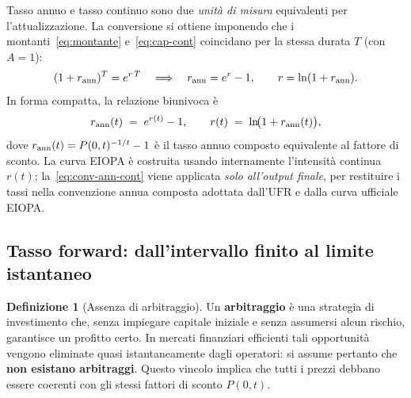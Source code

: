 \documentclass[11pt,a4paper]{article}
\theoremstyle{plain}
\theoremstyle{definition}
\newtheorem{definizione}[teorema]{Definizione}
\theoremstyle{remark}
\newcommand{\UFR}{\ensuremath{\mathrm{UFR}}}
\begin{document}

Tasso annuo e tasso continuo sono due \emph{unit\`a di misura} equivalenti per
l'attualizzazione. La conversione si ottiene imponendo che i montanti~\eqref{eq:montante}
e~\eqref{eq:cap-cont} coincidano per la stessa durata $T$ (con $A=1$):
\[
  (1+r_{\rm ann})^T = e^{r\,T}
  \quad\Longrightarrow\quad
  r_{\rm ann} = e^{r} - 1,\qquad r = \ln(1+r_{\rm ann}).
\]
In forma compatta, la relazione biunivoca \`e
\begin{equation}
  r_{\rm ann}(t) \;=\; e^{r(t)} - 1,
  \qquad
  r(t) \;=\; \ln\!\bigl(1 + r_{\rm ann}(t)\bigr),
  \label{eq:conv-ann-cont}
\end{equation}
dove $r_{\rm ann}(t) = P(0,t)^{-1/t}-1$ \`e il tasso annuo composto equivalente al fattore
di sconto. La curva EIOPA \`e costruita usando internamente l'intensit\`a continua $r(t)$;
la~\eqref{eq:conv-ann-cont} viene applicata \emph{solo all'output finale}, per
restituire i tassi nella convenzione annua composta adottata dall'$\UFR$ e dalla curva
ufficiale EIOPA.

\subsection{Tasso forward: dall'intervallo finito al limite istantaneo}


\begin{definizione}[Assenza di arbitraggio]
\label{def:noarb}
Un \textbf{arbitraggio} \`e una strategia di investimento che, senza impiegare capitale
iniziale e senza assumersi alcun rischio, garantisce un profitto certo. In mercati
finanziari efficienti tali opportunit\`a vengono eliminate quasi istantaneamente dagli
operatori: si assume pertanto che \textbf{non esistano arbitraggi}. Questo vincolo implica
che tutti i prezzi debbano essere coerenti con gli stessi fattori di sconto $P(0,t)$.
\end{definizione}
\end{document}
